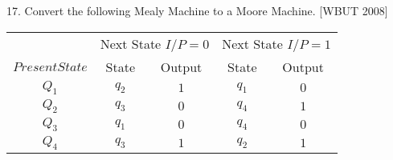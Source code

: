 \documentclass[8pt]{beamer}
\begin{document}
\begin{frame}
17. Convert the following Mealy Machine to a Moore Machine.  \hspace*{0.5cm} [WBUT 2008]\\

\vspace*{0.3cm}
\begin{center}
\begin{tabular}{ccccc}
 \hline

 \hline

 \hline

 \hline
 &  \multicolumn{2}{c}{ Next State   $I/P = 0$ } &  \multicolumn{2}{c}{ Next State   $ I/P = 1$}  \\
  \cline{2-3}                         \cline{4-5}
 $Present State$ &State & Output &  State & Output\\
\hline
$Q_1$   &  $q_2$  &  $1$  &  $q_1$  & $0$ \\
$Q_2$   &  $q_3$  &  $0$  &  $q_4$  & $1$ \\
$Q_3$   &  $q_1$  &  $0$  &  $q_4$  & $0$ \\
$Q_4$   &  $q_3$  &  $1$  &  $q_2$  & $1$ \\
 \hline

 \hline

 \hline

 \hline
\end{tabular}
\end{center}
\end{frame}
\end{document}
